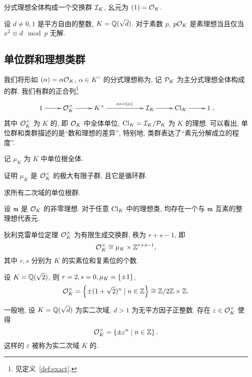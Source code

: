 \begin{exercise}
	分式理想全体构成一个交换群 ${\mathcal{I}}_K$, 幺元为 $(1)={\mathcal{O}}_K$.
\end{exercise}

\begin{exercise}
	设 $d\neq 0,1$ 是平方自由的整数, $K={\mathbb{Q}}(\sqrt{d})$. 对于素数 $p$, $p{\mathcal{O}}_K$ 是素理想当且仅当 $x^2\equiv d\mod p$ 无解.
\end{exercise}

\subsection{单位群和理想类群}

我们将形如 $(\alpha)=\alpha{\mathcal{O}}_K$, $\alpha\in K^\times$ 的分式理想称为, 记 ${\mathcal{P}}_K$ 为主分式理想全体构成的群.
我们有群的正合列\footnote{见定义~\ref{def:exact}.}
	\[\xymatrix{
	1\ar[r] &\CO_K^\times\ar[r] &K^\times \ar[rr]^{\alpha\mapsto (\alpha)} &&\CI_K\ar[r] &\Cl_K\ar[r] &1
	},\]
其中 ${\mathcal{O}}_K^\times$ 为 $K$ 的, 即 ${\mathcal{O}}_K$ 中全体单位, ${\mathrm{Cl}}_K={\mathcal{I}}_K/{\mathcal{P}}_K$ 为 $K$ 的理想. 
可以看出, 单位群和类群描述的是``数和理想的差异'', 特别地, 类群表达了``素元分解成立的程度''.

记 $\mu_K$ 为 $K$ 中单位根全体.

\begin{exercise}
	证明 $\mu_K$ 是 ${\mathcal{O}}_K^\times$ 的极大有限子群, 且它是循环群.
\end{exercise}

\begin{exercise}
	求所有二次域的单位根群.
\end{exercise}

\begin{exercise}
	设 ${\mathfrak{m}}$ 是 ${\mathcal{O}}_K$ 的非零理想. 对于任意 ${\mathrm{Cl}}_K$ 中的理想类, 均存在一个与 ${\mathfrak{m}}$ 互素的整理想代表元.
\end{exercise}

\begin{theorem}{狄利克雷单位定理}{}
	${\mathcal{O}}_K^\times$ 为有限生成交换群, 秩为 $r+s-1$, 即
		\[{\mathcal{O}}_K^\times\cong \mu_K\times {\mathbb{Z}}^{r+s-1},\]
	其中 $r,s$ 分别为 $K$ 的实素位和复素位的个数.
\end{theorem}

\begin{example}
	设 $K={\mathbb{Q}}(\sqrt2)$, 则 $r=2,s=0,\mu_K=\left\{\pm1\right\}$,
	\[{\mathcal{O}}_K^\times=\left\{\pm(1+\sqrt2)^n\mid n\in{\mathbb{Z}}\right\}\cong{\mathbb{Z}}/2{\mathbb{Z}}\times {\mathbb{Z}}.\]

	一般地, 设 $K={\mathbb{Q}}(\sqrt{d})$ 为实二次域, $d>1$ 为无平方因子正整数. 存在 $\varepsilon\in{\mathcal{O}}_K^\times$ 使得
	\[{\mathcal{O}}_K^\times=\left\{\pm \varepsilon^n\mid n\in {\mathbb{Z}}\right\}.\]
这样的 $\varepsilon$ 被称为实二次域 $K$ 的.
\end{example}

